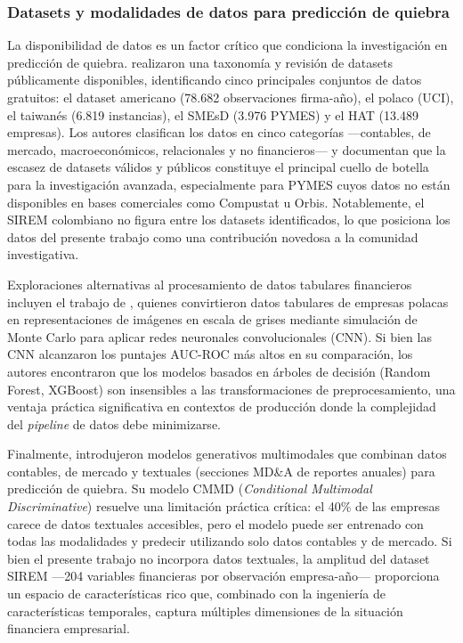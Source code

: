 \documentclass[12pt, letterpaper]{article}
\begin{document}
\subsubsection{Datasets y modalidades de datos para predicci\'on de quiebra}

La disponibilidad de datos es un factor cr\'itico que condiciona la investigaci\'on en predicci\'on de quiebra. \citet{Wang2024datasets} realizaron una taxonom\'ia y revisi\'on de datasets p\'ublicamente disponibles, identificando cinco principales conjuntos de datos gratuitos: el dataset americano (78.682 observaciones firma-a\~no), el polaco (UCI), el taiwan\'es (6.819 instancias), el SMEsD (3.976 PYMES) y el HAT (13.489 empresas). Los autores clasifican los datos en cinco categor\'ias ---contables, de mercado, macroecon\'omicos, relacionales y no financieros--- y documentan que la escasez de datasets v\'alidos y p\'ublicos constituye el principal cuello de botella para la investigaci\'on avanzada, especialmente para PYMES cuyos datos no est\'an disponibles en bases comerciales como Compustat u Orbis. Notablemente, el SIREM colombiano no figura entre los datasets identificados, lo que posiciona los datos del presente trabajo como una contribuci\'on novedosa a la comunidad investigativa.

Exploraciones alternativas al procesamiento de datos tabulares financieros incluyen el trabajo de \citet{DzikWalczak2021}, quienes convirtieron datos tabulares de empresas polacas en representaciones de im\'agenes en escala de grises mediante simulaci\'on de Monte Carlo para aplicar redes neuronales convolucionales (CNN). Si bien las CNN alcanzaron los puntajes AUC-ROC m\'as altos en su comparaci\'on, los autores encontraron que los modelos basados en \'arboles de decisi\'on (Random Forest, XGBoost) son insensibles a las transformaciones de preprocesamiento, una ventaja pr\'actica significativa en contextos de producci\'on donde la complejidad del \textit{pipeline} de datos debe minimizarse.

Finalmente, \citet{Mancisidor2024} introdujeron modelos generativos multimodales que combinan datos contables, de mercado y textuales (secciones MD\&A de reportes anuales) para predicci\'on de quiebra. Su modelo CMMD (\textit{Conditional Multimodal Discriminative}) resuelve una limitaci\'on pr\'actica cr\'itica: el 40\% de las empresas carece de datos textuales accesibles, pero el modelo puede ser entrenado con todas las modalidades y predecir utilizando solo datos contables y de mercado. Si bien el presente trabajo no incorpora datos textuales, la amplitud del dataset SIREM ---204 variables financieras por observaci\'on empresa-a\~no--- proporciona un espacio de caracter\'isticas rico que, combinado con la ingenier\'ia de caracter\'isticas temporales, captura m\'ultiples dimensiones de la situaci\'on financiera empresarial.
\end{document}
